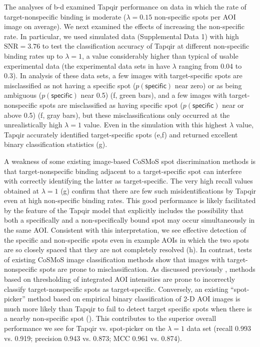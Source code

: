 The analyses of b-d examined Tapqir performance on data in which the rate of target-nonspecific binding is moderate ($\lambda = 0.15$ non-specific spots per AOI image on average).  We next examined the effects of increasing the non-specific rate.  In particular, we used simulated data (Supplemental Data 1) with high $\mathrm{SNR} = 3.76$ to test the classification accuracy of Tapqir at different non-specific binding rates up to $\lambda = 1$, a value considerably higher than typical of usable experimental data (the experimental data sets in  have $\lambda$ ranging from 0.04 to 0.3).   In analysis of these data sets, a few images with target-specific spots are misclassified as not having a specific spot ($p(\mathsf{specific})$ near zero) or as being ambiguous ($p(\mathsf{specific})$ near 0.5) (f, green bars), and a few images with target-nonspecific spots are misclassified as having specific spot ($p(\mathsf{specific})$ near or above 0.5) (f, gray bars), but these misclassifications only occurred at the unrealistically high $\lambda = 1$ value.  Even in the simulation with this highest $\lambda$ value, Tapqir accurately identified target-specific spots (e,f) and returned excellent binary classification statistics (g). 

A weakness of some existing image-based CoSMoS spot discrimination methods is that target-nonspecific binding adjacent to a target-specific spot can interfere with correctly identifying the latter as target-specific.  The very high recall values obtained at $\lambda = 1$ (g) confirm that there are few such misidentifications by Tapqir even at high non-specific binding rates.  This good performance is likely facilitated by the feature of the Tapqir model that explicitly includes the possibility that both a specifically and a non-specifically bound spot may occur simultaneously in the same AOI. Consistent with this interpretation, we see effective detection of the specific and non-specific spots even in example AOIs in which the two spots are so closely spaced that they are not completely resolved (h). In contrast, tests of existing CoSMoS image classification methods show that images with target-nonspecific spots are prone to misclassification.  As discussed previously \citep{Friedman2015-nx}, methods based on thresholding of integrated AOI intensities are prone to incorrectly classify target-nonspecific spots as target-specific.  Conversely, an existing ``spot-picker'' method based on empirical binary classification of 2-D AOI images \citep{Friedman2015-nx} is much more likely than Tapqir to fail to detect target specific spots when there is a nearby non-specific spot   ().  This contributes to the superior overall performance we see for Tapqir vs. spot-picker on the $\lambda = 1$ data set (recall 0.993 vs. 0.919; precision 0.943 vs. 0.873; MCC 0.961 vs. 0.874).

